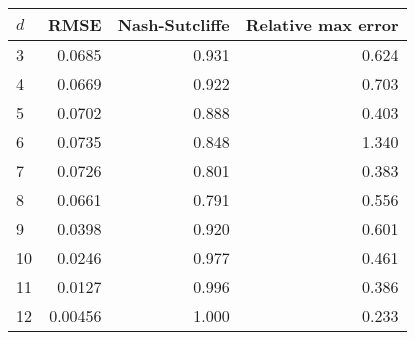 \begin{tabular}{| l | r r r |}
  \hline
  $d$ & RMSE & Nash-Sutcliffe & Relative max error \\
  \hline
   3 &    0.0685 &    0.931 &    0.624 \\
   4 &    0.0669 &    0.922 &    0.703 \\
   5 &    0.0702 &    0.888 &    0.403 \\
   6 &    0.0735 &    0.848 &    1.340 \\
   7 &    0.0726 &    0.801 &    0.383 \\
   8 &    0.0661 &    0.791 &    0.556 \\
   9 &    0.0398 &    0.920 &    0.601 \\
   10 &    0.0246 &    0.977 &    0.461 \\
   11 &    0.0127 &    0.996 &    0.386 \\
   12 &    0.00456 &    1.000 &    0.233 \\
  \hline
\end{tabular}
